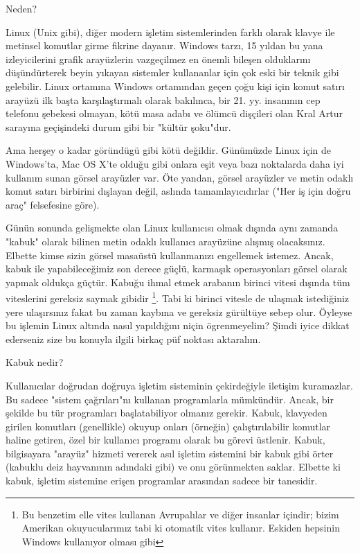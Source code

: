\begin{section}{Neden?}

Linux (Unix gibi), diğer modern işletim sistemlerinden farklı olarak klavye ile metinsel komutlar girme fikrine dayanır. Windows tarzı, 15 yıldan bu yana izleyicilerini grafik arayüzlerin vazgeçilmez en önemli bileşen olduklarını düşündürterek beyin yıkayan sistemler kullananlar için çok eski bir teknik gibi gelebilir. Linux ortamına Windows ortamından geçen çoğu kişi için komut satırı arayüzü ilk başta karşılaştırmalı olarak bakılınca, bir 21. yy. insanının cep telefonu şebekesi olmayan, kötü masa adabı ve ölümcü dişçileri olan Kral Artur sarayına geçişindeki durum gibi bir "kültür şoku"dur.

Ama herşey o kadar göründügü gibi kötü değildir. Günümüzde Linux için de Windows'ta, Mac OS X'te olduğu gibi onlara eşit veya bazı noktalarda daha iyi kullanım sunan görsel arayüzler var. Öte yandan, görsel arayüzler ve metin odaklı komut satırı birbirini dışlayan değil, aslında tamamlayıcıdırlar ("Her iş için doğru araç" felsefesine göre).

Günün sonunda gelişmekte olan Linux kullanıcısı olmak dışında aynı zamanda "kabuk" olarak bilinen metin odaklı kullanıcı arayüzüne alışmış olacaksınız. Elbette kimse sizin görsel masaüstü kullanmanızı engellemek istemez. Ancak, kabuk ile yapabileceğimiz son derece güçlü, karmaşık operasyonları görsel olarak yapmak oldukça güçtür. Kabuğu ihmal etmek arabanın birinci vitesi dışında tüm viteslerini gereksiz saymak gibidir
\footnote{Bu benzetim elle vites kullanan Avrupalılar ve diğer insanlar içindir; bizim Amerikan okuyucularımız tabi ki otomatik vites kullanır.
Eskiden hepsinin Windows kullanıyor olması gibi}. Tabi ki birinci vitesle de ulaşmak istediğiniz yere ulaşırsınız fakat bu zaman kaybına ve gereksiz gürültüye sebep olur. Öyleyse bu işlemin Linux altında nasıl yapıldığını niçin ögrenmeyelim? Şimdi iyice dikkat ederseniz size bu konuyla ilgili birkaç püf noktası aktaralım.

\begin{subsection}{Kabuk nedir?}

Kullanıcılar doğrudan doğruya işletim sisteminin çekirdeğiyle iletişim kuramazlar. Bu sadece "sistem çağrıları"nı kullanan programlarla mümkündür. Ancak, bir şekilde bu tür programları başlatabiliyor olmanız gerekir. Kabuk, klavyeden girilen komutları (genellikle) okuyup onları (örneğin) çalıştırılabilir komutlar haline getiren, özel bir kullanıcı programı olarak bu görevi üstlenir. Kabuk, bilgisayara "arayüz" hizmeti vererek asıl işletim sistemini bir kabuk gibi örter (kabuklu deiz hayvanının adındaki gibi) ve onu görünmekten saklar. Elbette ki kabuk, işletim sistemine erişen programlar arasından sadece bir tanesidir.


\end{subsection}
\end{section}
